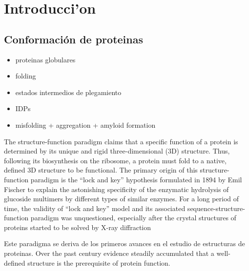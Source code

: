 \chapter{Introducci'on}
% 



\section{Conformación de proteinas}
\begin{itemize}
 \item proteinas globulares
 \item folding
 \item estados intermedios de plegamiento
 \item IDPs
 \item misfolding + aggregation + amyloid formation
\end{itemize}


The structure-function paradigm claims that a specific function of a protein is determined by its unique and rigid three-dimensional (3D) structure. 
Thus, following its biosynthesis on the ribosome, a protein must fold to a native, defined 3D structure to be functional. 
The primary origin of this structure-function paradigm is the “lock and key” hypothesis formulated in 1894 by Emil Fischer to explain the astonishing specificity of the enzymatic hydrolysis of glucoside multimers by different types
of similar enzymes. For a long period of time, the validity of “lock and key” model and its associated sequence-structure-function paradigm was unquestioned, especially after the crystal structures of proteins started to be solved by X-ray diffraction

Este paradigma se deriva de los primeros avances en el estudio de estructuras de proteinas. Over the past century evidence steadily accumulated that a well-defined structure is the prerequisite of protein function.



